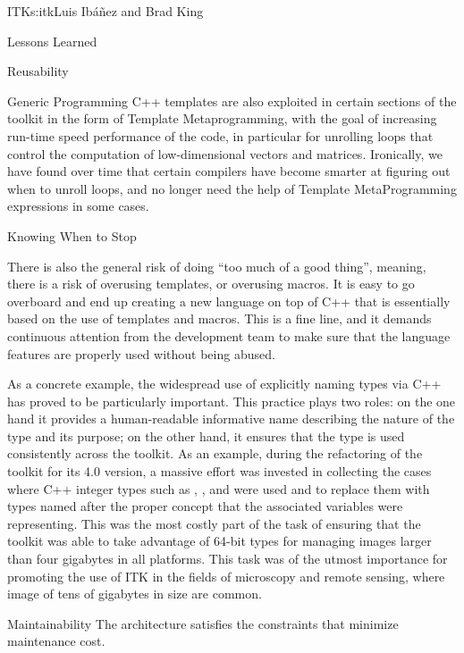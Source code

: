 \begin{aosachapter}{ITK}{s:itk}{Luis Ib\'{a}\~{n}ez and Brad King}
\begin{aosasect1}{Lessons Learned}
\begin{aosasect2}{Reusability}
\begin{aosasect3}{Generic Programming}
C++ templates are also exploited in certain sections of the toolkit in the form
of Template Metaprogramming, with the goal of increasing run-time speed
performance of the code, in particular for unrolling loops that control the
computation of low-dimensional vectors and matrices. Ironically, we have found
over time that certain compilers have become smarter at figuring out when to
unroll loops, and no longer need the help of Template MetaProgramming
expressions in some cases.

\end{aosasect3}

\begin{aosasect3}{Knowing When to Stop}

There is also the general risk of doing ``too much of a good thing'',
meaning, there is a risk of overusing templates, or overusing macros. It is 
easy to go overboard and end up creating a new
language on top of C++ that is essentially based on the use of templates and
macros. This is a fine line, and it demands continuous attention from the
development team to make sure that the language features are properly used
without being abused.

As a concrete example, the widespread use of explicitly naming types via C++
 has proved to be particularly important. This practice plays two
roles: on the one hand it provides a human-readable informative name describing the
nature of the type and its purpose; on the other hand, it ensures that the type
is used consistently across the toolkit. As an example, during the refactoring
of the toolkit for its 4.0 version, a massive effort was invested in collecting
the cases where C++ integer types such as , ,
 and  were used and to
replace them with types named after the proper concept that the associated
variables were representing. This was the most costly part of the task of
ensuring that the toolkit was able to take advantage of 64-bit types for
managing images larger than four gigabytes in all platforms. This task was of the
utmost importance for promoting the use of ITK in the fields of microscopy and
remote sensing, where image of tens of gigabytes in size are common.

\end{aosasect3}

\end{aosasect2}

\begin{aosasect2}{Maintainability}
The architecture satisfies the constraints that minimize maintenance cost.


\end{aosasect2}
\end{aosasect1}
\end{aosachapter}
